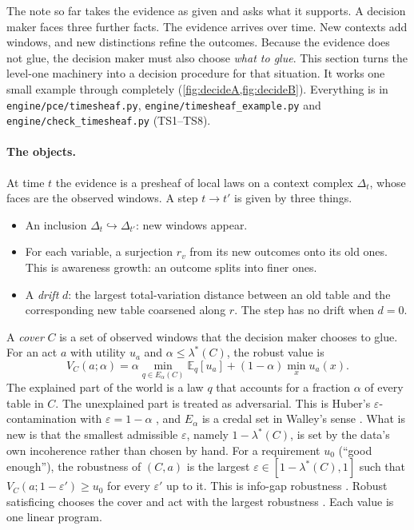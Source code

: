 \documentclass[11pt]{article}
\theoremstyle{definition}\newtheorem{definition}[theorem]{Definition}\newtheorem{remark}[theorem]{Remark}\newtheorem{example}[theorem]{Example}
\begin{document}
The note so far takes the evidence as given and asks what it supports. A decision maker faces three further facts. The evidence arrives
over time. New contexts add windows, and new distinctions refine the outcomes. Because the evidence does not glue, the decision maker must
also choose \emph{what to glue}. This section turns the level-one machinery into a decision procedure for that situation. It works one
small example through completely (\cref{fig:decideA,fig:decideB}). Everything is in \texttt{engine/pce/timesheaf.py},
\texttt{engine/timesheaf\_example.py} and \texttt{engine/check\_timesheaf.py} (TS1--TS8).

\paragraph{The objects.}
At time $t$ the evidence is a presheaf of local laws on a context complex $\Delta_t$, whose faces are the observed windows. A step
$t\to t'$ is given by three things.
\begin{itemize}
\item An inclusion $\Delta_t\hookrightarrow\Delta_{t'}$: new windows appear.
\item For each variable, a surjection $r_v$ from its new outcomes onto its old ones. This is awareness growth: an outcome splits into
  finer ones.
\item A \emph{drift} $d$: the largest total-variation distance between an old table and the corresponding new table coarsened along
  $r$. The step has no drift when $d=0$.
\end{itemize}
A \emph{cover} $C$ is a set of observed windows that the decision maker chooses to glue. For an act $a$ with utility $u_a$ and
$\alpha\le\lambda^*(C)$, the robust value is
\[V_C(a;\alpha)=\alpha\min_{q\in E_\alpha(C)}\mathbb E_q[u_a]+(1-\alpha)\min_xu_a(x).\]
The explained part of the world is a law $q$ that accounts for a fraction $\alpha$ of every table in $C$. The unexplained part is treated as
adversarial. This is Huber's $\varepsilon$-contamination with $\varepsilon=1-\alpha$ \cite{Huber1964}, and $E_\alpha$ is a credal set in
Walley's sense \cite{Walley1991}. What is new is that the smallest admissible $\varepsilon$, namely $1-\lambda^*(C)$, is set by the data's
own incoherence rather than chosen by hand. For a requirement $u_0$ (``good enough''), the robustness of $(C,a)$ is the largest
$\varepsilon\in[1-\lambda^*(C),1]$ such that $V_C(a;1-\varepsilon')\ge u_0$ for every $\varepsilon'$ up to it. This is info-gap robustness
\cite{BenHaim2006}. Robust satisficing chooses the cover and act with the largest robustness \cite{SchwartzBenHaimDacso2011,LongSimZhou2023}.
Each value is one linear program.
\end{document}
